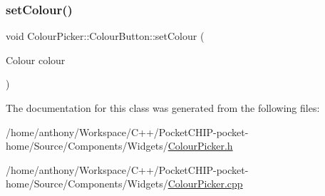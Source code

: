 \mbox{\label{classColourPicker_1_1ColourButton_aa7fc429f8a2374de5c09af1ef8ddc3ae}} 
\subsubsection{\texorpdfstring{set\+Colour()}{setColour()}}
{\footnotesize\ttfamily void Colour\+Picker\+::\+Colour\+Button\+::set\+Colour (\begin{DoxyParamCaption}\item[{Colour}]{colour }\end{DoxyParamCaption})}



The documentation for this class was generated from the following files\+:\begin{DoxyCompactItemize}
\item 
/home/anthony/\+Workspace/\+C++/\+Pocket\+C\+H\+I\+P-\/pocket-\/home/\+Source/\+Components/\+Widgets/\mbox{\hyperlink{ColourPicker_8h}{Colour\+Picker.\+h}}\item 
/home/anthony/\+Workspace/\+C++/\+Pocket\+C\+H\+I\+P-\/pocket-\/home/\+Source/\+Components/\+Widgets/\mbox{\hyperlink{ColourPicker_8cpp}{Colour\+Picker.\+cpp}}\end{DoxyCompactItemize}
